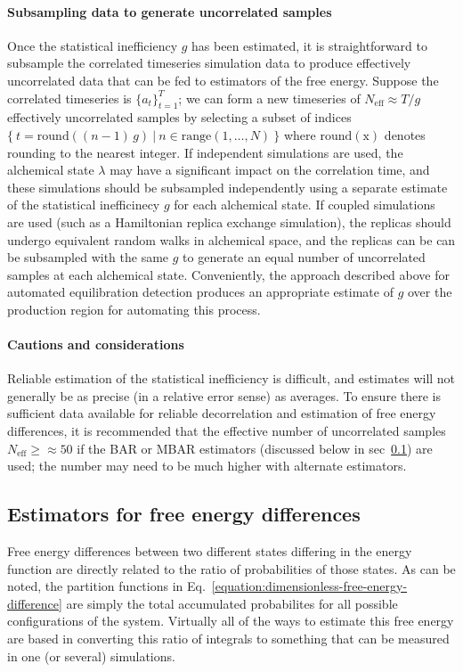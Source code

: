 \documentclass[9pt,bestpractices]{livecoms}
\begin{document}
\paragraph{Subsampling data to generate uncorrelated samples}
Once the statistical inefficiency $g$ has been estimated, it is straightforward to subsample the correlated timeseries simulation data to produce effectively uncorrelated data that can be fed to estimators of the free energy.
Suppose the correlated timeseries is $\{a_t\}_{t=1}^T$; we can form a new timeseries of $N_{\mathrm{eff}} \approx T / g$ effectively uncorrelated samples by selecting a subset of indices $\{ \: t = \mathrm{round}((n-1) \, g) \: | \: n \in \mathrm{range}(1,\ldots ,N) \: \}$ where $\mathrm{round(x)}$ denotes rounding to the nearest integer.
%
If independent simulations are used, the alchemical state $\lambda$ may have a significant impact on the correlation time, and these simulations should be subsampled independently using a separate estimate of the statistical inefficinecy $g$ for each alchemical state.
If coupled simulations are used (such as a Hamiltonian replica exchange simulation), the replicas should undergo equivalent random walks in alchemical space, and the replicas can be can be subsampled with the same $g$ to generate an equal number of uncorrelated samples at each alchemical state.
Conveniently, the approach described above for automated equilibration detection produces an appropriate estimate of $g$ over the production region for automating this process.
%
\paragraph{Cautions and considerations}
Reliable estimation of the statistical inefficiency is difficult, and estimates will not generally be as precise (in a relative error sense) as averages.
To ensure there is sufficient data available for reliable decorrelation and estimation of free energy differences, it is recommended that the effective number of uncorrelated samples $N_{\mathrm{eff}} \ge \approx 50$ if the BAR or MBAR estimators (discussed below in sec~\ref{subsec:estimators}) are used; the number may need to be much higher with alternate estimators.
%
\subsection{Estimators for free energy differences}
\label{subsec:estimators}
Free energy differences between two different states differing in the energy function are directly related to the
ratio of probabilities of those states.
As can be noted, the partition functions in Eq.~\ref{equation:dimensionless-free-energy-difference} are simply the total accumulated probabilites for all possible configurations of the system. Virtually all of the ways to estimate this free energy are based in converting this ratio of integrals to something that can be measured in one (or several) simulations.  
%
\end{document}
